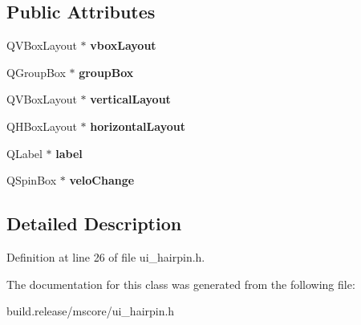 \subsection*{Public Attributes}
\begin{DoxyCompactItemize}
\item 
\mbox{\label{class_ui___hairpin_base_acfc7a01752e01607f6ff81bfaa75ee77}} 
Q\+V\+Box\+Layout $\ast$ {\bfseries vbox\+Layout}
\item 
\mbox{\label{class_ui___hairpin_base_a1b301af9d4684f62b89b72382e70e26b}} 
Q\+Group\+Box $\ast$ {\bfseries group\+Box}
\item 
\mbox{\label{class_ui___hairpin_base_a63fe860ca38b8b7dc12ceafc35866ade}} 
Q\+V\+Box\+Layout $\ast$ {\bfseries vertical\+Layout}
\item 
\mbox{\label{class_ui___hairpin_base_a4403fb4876d92bc8f9f0a1e9eaf3783d}} 
Q\+H\+Box\+Layout $\ast$ {\bfseries horizontal\+Layout}
\item 
\mbox{\label{class_ui___hairpin_base_ab7b179c14f1f1ef642a456d007f2396d}} 
Q\+Label $\ast$ {\bfseries label}
\item 
\mbox{\label{class_ui___hairpin_base_a9192096de3c61e7f53861fd261c96f22}} 
Q\+Spin\+Box $\ast$ {\bfseries velo\+Change}
\end{DoxyCompactItemize}


\subsection{Detailed Description}


Definition at line 26 of file ui\+\_\+hairpin.\+h.



The documentation for this class was generated from the following file\+:\begin{DoxyCompactItemize}
\item 
build.\+release/mscore/ui\+\_\+hairpin.\+h\end{DoxyCompactItemize}
